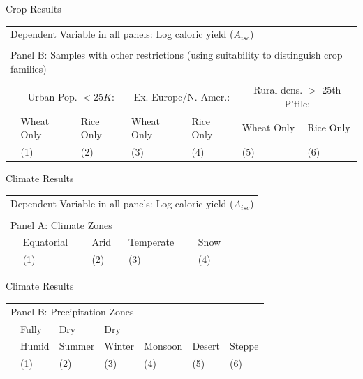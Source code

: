\documentclass[10pt, xcolor=dvipsnames]{beamer}
\begin{document}
\begin{frame}{Crop Results}

{\footnotesize
\begin{tabularx}{\textwidth}{lXXXXXX}
\midrule
\multicolumn{7}{l}{Dependent Variable in all panels: Log caloric yield ($A_{isc}$)} \\ \\
\multicolumn{7}{l}{Panel B: Samples with other restrictions (using suitability to distinguish crop families)} \\ \\
 & \multicolumn{2}{c}{Urban Pop. $<25K$:} & \multicolumn{2}{c}{Ex. Europe/N. Amer.:} & \multicolumn{2}{c}{Rural dens. $>$ 25th P'tile:}\\ \cmidrule(lr){2-3} \cmidrule(lr){4-5} \cmidrule(lr){6-7}
  & Wheat Only& Rice Only & Wheat Only& Rice Only& Wheat Only& Rice Only\\
 & (1) & (2) & (3) & (4) & (5) & (6) \\
\midrule

\midrule
\end{tabularx}
}
\end{frame}

\begin{frame}{Climate Results}\label{climatereg}

{\footnotesize
\begin{tabularx}{\textwidth}{lXXXXXX}
\midrule
\multicolumn{7}{l}{Dependent Variable in all panels: Log caloric yield ($A_{isc}$)} \\ \\
\multicolumn{7}{l}{Panel A: Climate Zones} \\
 & Equatorial & Arid & Temperate & Snow  &     &   \\
 & (1) & (2) & (3) & (4) &  & \\
\midrule

\midrule
\end{tabularx}
}

\hfill \hyperlink{climate}{}
\end{frame}

\begin{frame}{Climate Results}

{\footnotesize
\begin{tabularx}{\textwidth}{lXXXXXX}
\midrule
\multicolumn{7}{l}{Panel B: Precipitation Zones} \\
& Fully     & Dry         & Dry        &              &            & \\
& Humid & Summer & Winter & Monsoon & Desert & Steppe \\
 & (1) & (2) & (3) & (4) & (5) & (6) \\
\midrule

\midrule
\end{tabularx}
}

\end{frame}
\end{document}

